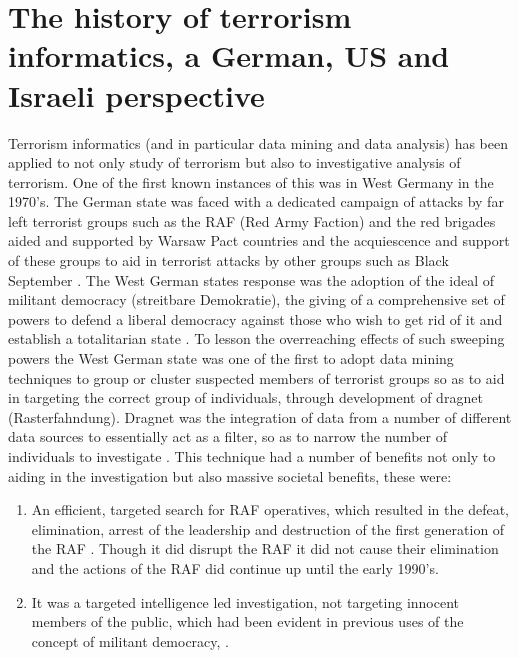 \section{The history of terrorism informatics, a German, US and Israeli perspective}
Terrorism informatics (and in particular data mining and data analysis) has been applied to not only study of terrorism but also to investigative analysis of terrorism. One of the first known instances of this was in West Germany in the 1970's. The German state was faced with a dedicated campaign of attacks by far left terrorist  groups such as the RAF (Red Army Faction) and the red brigades aided and supported by Warsaw Pact countries \citep{leighton2014strange} and the acquiescence and support of these groups to aid in terrorist attacks by other groups such as Black September
\citep{nacos2016terrorism}. The West German states response was the adoption of the ideal of militant democracy (streitbare Demokratie), the giving of a comprehensive set of powers to defend a liberal democracy against those who wish to get rid of it and establish a totalitarian state \citep{rosenfeld2014militant}. To lesson the overreaching effects of such sweeping powers the West German state was one of the first to adopt data mining techniques to group or cluster suspected members of terrorist groups so as to aid in targeting the correct group of individuals, through development of dragnet (Rasterfahndung). Dragnet was the integration of data from a number of different data sources to essentially act as  a filter, so as to narrow the number of individuals to investigate \citep{weinhauer2014terror}. This technique had a number of benefits not only to aiding in the investigation but also massive societal benefits, these were:
\begin{enumerate}
\item An efficient, targeted search for RAF operatives, which resulted in the defeat, elimination, arrest of the leadership \citep{hauser1997baader} and destruction of the first generation of the RAF \citep{weinhauer2006terrorismus}. Though it did disrupt the RAF it did not cause their elimination and the actions of the RAF did continue up until the early 1990's.
\item It was a targeted intelligence led investigation, not targeting innocent members of the public, which had been evident in previous uses of the concept of militant democracy, \citep{de2010counter}.
\end{enumerate}

